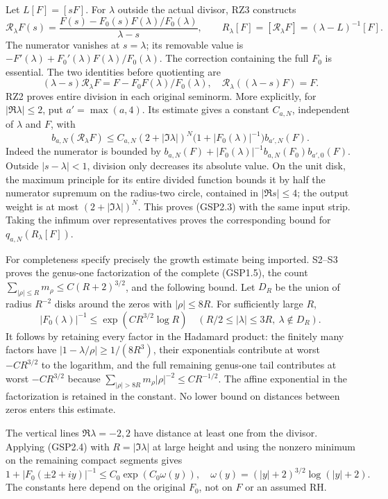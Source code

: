 Let \(L[F]=[sF]\). For \(\lambda\) outside the actual divisor, RZ3
constructs \[
\mathscr R_\lambda F(s)
=\frac{F(s)-F_0(s)F(\lambda)/F_0(\lambda)}{\lambda-s},\qquad
R_\lambda[F]=[\mathscr R_\lambda F]=(\lambda-L)^{-1}[F].
\tag{GSP2.1}
\] The numerator vanishes at \(s=\lambda\); its removable value is
\(-F'(\lambda)+F_0'(\lambda)F(\lambda)/F_0(\lambda)\). The correction
containing the full \(F_0\) is essential. The two identities before
quotienting are \[
(\lambda-s)\mathscr R_\lambda F=F-F_0F(\lambda)/F_0(\lambda),
\quad \mathscr R_\lambda((\lambda-s)F)=F.
\tag{GSP2.2}
\] RZ2 proves entire division in each original seminorm. More
explicitly, for \(|\Re\lambda|\le2\), put \(a'=\max(a,4)\). Its estimate
gives a constant \(C_{a,N}\), independent of \(\lambda\) and \(F\), with
\[
b_{a,N}(\mathscr R_\lambda F)
\le C_{a,N}(2+|\Im\lambda|)^N
\bigl(1+|F_0(\lambda)|^{-1}\bigr)b_{a',N}(F).
\tag{GSP2.3}
\] Indeed the numerator is bounded by
\(b_{a,N}(F)+|F_0(\lambda)|^{-1}b_{a,N}(F_0)b_{a',0}(F)\). Outside
\(|s-\lambda|<1\), division only decreases its absolute value. On the
unit disk, the maximum principle for its entire divided function bounds
it by half the numerator supremum on the radius-two circle, contained in
\(|\Re s|\le4\); the output weight is at most \((2+|\Im\lambda|)^N\).
This proves (GSP2.3) with the same input strip. Taking the infimum over
representatives proves the corresponding bound for
\(q_{a,N}(R_\lambda[F])\).

For completeness specify precisely the growth estimate being imported.
S2--S3 proves the genus-one factorization of the complete (GSP1.5), the
count \(\sum_{|\rho|\le R}m_\rho\le C(R+2)^{3/2}\), and the following
bound. Let \(D_R\) be the union of radius \(R^{-2}\) disks around the
zeros with \(|\rho|\le8R\). For sufficiently large \(R\), \[
|F_0(\lambda)|^{-1}\le
\exp(CR^{3/2}\log R)
\quad(R/2\le|\lambda|\le3R,\ \lambda\notin D_R).
\tag{GSP2.4}
\] It follows by retaining every factor in the Hadamard product: the
finitely many factors have \(|1-\lambda/\rho|\ge1/(8R^3)\), their
exponentials contribute at worst \(-CR^{3/2}\) to the logarithm, and the
full remaining genus-one tail contributes at worst \(-CR^{3/2}\) because
\(\sum_{|\rho|>8R}m_\rho|\rho|^{-2}\le CR^{-1/2}\). The affine
exponential in the factorization is retained in the constant. No lower
bound on distances between zeros enters this estimate.

The vertical lines \(\Re\lambda=-2,2\) have distance at least one from
the divisor. Applying (GSP2.4) with \(R=|\Im\lambda|\) at large height
and using the nonzero minimum on the remaining compact segments gives \[
1+|F_0(\pm2+iy)|^{-1}\le C_0\exp(C_0\omega(y)),
\quad \omega(y)=(|y|+2)^{3/2}\log(|y|+2).
\tag{GSP2.5}
\] The constants here depend on the original \(F_0\), not on \(F\) or an
assumed RH.

